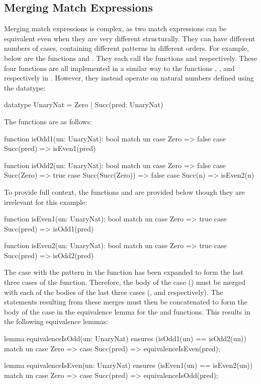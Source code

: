 \subsection{Merging Match Expressions}\label{sec:merging-match-expressions}

Merging match expressions is complex, as two match expressions can be equivalent even when they are very different structurally. They can have different numbers of cases, containing different patterns in different orders. For example, below are the functions  and . They each call the functions  and  respectively. These four functions are all implemented in a similar way to the functions , ,  and  respectively in . However, they instead operate on natural numbers defined using the  datatype:
\begin{dafny}
datatype UnaryNat = Zero | Succ(pred: UnaryNat)
\end{dafny}
% 
The functions are as follows:
\begin{dafny}
function isOdd1(un: UnaryNat): bool {
  match un
  case Zero => false 
  case Succ(pred) => isEven1(pred)
}

function isOdd2(un: UnaryNat): bool {
  match un
  case Zero => false 
  case Succ(Zero) => true 
  case Succ(Succ(Zero)) => false 
  case Succ(n) => isEven2(n)
}
\end{dafny}
%
To provide full context, the functions  and  are provided below though they are irrelevant for this example:
\begin{dafny}
function isEven1(un: UnaryNat): bool {
  match un
  case Zero => true
  case Succ(pred) => isOdd1(pred)
}

function isEven2(un: UnaryNat): bool {
  match un
  case Zero => true
  case Succ(pred) => isOdd2(pred)
}
\end{dafny}

The case with the pattern  in the  function has been expanded to form the last three cases of the  function. Therefore, the body of the  case () must be merged with each of the bodies of the last three cases (,  and  respectively). The statements resulting from these merges must then be concatenated to form the body of the  case in the equivalence lemma for the  and  functions. This results in the following equivalence lemmas:
\begin{dafny}
lemma equivalenceIsOdd(un: UnaryNat)
  ensures (isOdd1(un) == isOdd2(un))
{
  match un
  case Zero => {}
  case Succ(pred) => equivalenceIsEven(pred);
}

lemma equivalenceIsEven(un: UnaryNat)
  ensures (isEven1(un) == isEven2(un))
{
  match un
  case Zero => {}
  case Succ(pred) => equivalenceIsOdd(pred);
}
\end{dafny}

